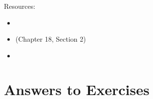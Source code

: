 \documentclass{tufte-handout}
\begin{document}
Resources:
\begin{itemize}
\item \citet{Scott:1971aa}
\item \citet{barendregt84:_lambda_calculus} (Chapter 18, Section 2)
\item \citet{Amadio:1998fk}
\end{itemize}

\clearpage
\pagebreak

\section*{Answers to Exercises}

\shipoutAnswer

\clearpage
\pagebreak



\end{document}
